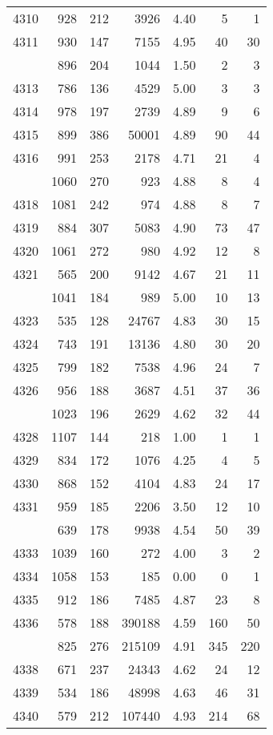 \documentclass[
]{article}
\begin{document}
\begin{table}
\begin{tabular}[t]{lrrrrrr}
4310 & 928 & 212 & 3926 & 4.40 & 5 & 1\\
4311 & 930 & 147 & 7155 & 4.95 & 40 & 30\\
\addlinespace
4312 & 896 & 204 & 1044 & 1.50 & 2 & 3\\
4313 & 786 & 136 & 4529 & 5.00 & 3 & 3\\
4314 & 978 & 197 & 2739 & 4.89 & 9 & 6\\
4315 & 899 & 386 & 50001 & 4.89 & 90 & 44\\
4316 & 991 & 253 & 2178 & 4.71 & 21 & 4\\
\addlinespace
4317 & 1060 & 270 & 923 & 4.88 & 8 & 4\\
4318 & 1081 & 242 & 974 & 4.88 & 8 & 7\\
4319 & 884 & 307 & 5083 & 4.90 & 73 & 47\\
4320 & 1061 & 272 & 980 & 4.92 & 12 & 8\\
4321 & 565 & 200 & 9142 & 4.67 & 21 & 11\\
\addlinespace
4322 & 1041 & 184 & 989 & 5.00 & 10 & 13\\
4323 & 535 & 128 & 24767 & 4.83 & 30 & 15\\
4324 & 743 & 191 & 13136 & 4.80 & 30 & 20\\
4325 & 799 & 182 & 7538 & 4.96 & 24 & 7\\
4326 & 956 & 188 & 3687 & 4.51 & 37 & 36\\
\addlinespace
4327 & 1023 & 196 & 2629 & 4.62 & 32 & 44\\
4328 & 1107 & 144 & 218 & 1.00 & 1 & 1\\
4329 & 834 & 172 & 1076 & 4.25 & 4 & 5\\
4330 & 868 & 152 & 4104 & 4.83 & 24 & 17\\
4331 & 959 & 185 & 2206 & 3.50 & 12 & 10\\
\addlinespace
4332 & 639 & 178 & 9938 & 4.54 & 50 & 39\\
4333 & 1039 & 160 & 272 & 4.00 & 3 & 2\\
4334 & 1058 & 153 & 185 & 0.00 & 0 & 1\\
4335 & 912 & 186 & 7485 & 4.87 & 23 & 8\\
4336 & 578 & 188 & 390188 & 4.59 & 160 & 50\\
\addlinespace
4337 & 825 & 276 & 215109 & 4.91 & 345 & 220\\
4338 & 671 & 237 & 24343 & 4.62 & 24 & 12\\
4339 & 534 & 186 & 48998 & 4.63 & 46 & 31\\
4340 & 579 & 212 & 107440 & 4.93 & 214 & 68\\

\end{tabular}
\end{table}
\end{document}
